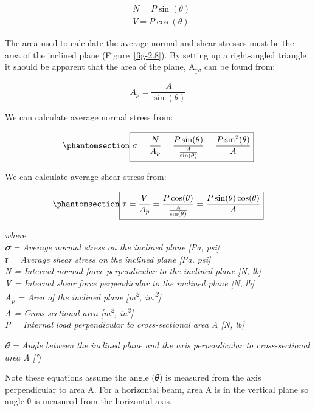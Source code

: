 \documentclass[
  letterpaper,
  DIV=11,
  numbers=noendperiod]{scrreprt}
\theoremstyle{definition}
\theoremstyle{remark}
\begin{document}
\[
\begin{aligned}
& N=P \sin (\theta) \\
& V=P \cos (\theta)
\end{aligned}
\]

The area used to calculate the average normal and shear stresses must be
the area of the inclined plane (Figure~\ref{fig-2.8}). By setting up a
right-angled triangle it should be apparent that the area of the plane,
A\textsubscript{p}, can be found from:

\[
A_p=\frac{A}{\sin (\theta)}
\]

We can calculate average normal stress from:

\begin{equation}\phantomsection\label{eq-2.3}{\boxed{\sigma=\frac{N}{A_p}=\frac{P \sin (\theta)}{\frac{A}{\sin (\theta)}}=\frac{P \sin ^2(\theta)}{A}}}\end{equation}

We can calculate average shear stress from:

\begin{equation}\phantomsection\label{eq-2.4}{\boxed{\tau=\frac{V}{A_p}=\frac{P \cos (\theta)}{\frac{A}{\sin (\theta)}}=\frac{P \sin (\theta) \cos (\theta)}{A}}}\end{equation}

\emph{where}\\
\emph{𝜎 = Average normal stress on the inclined plane {[}Pa, psi{]}}\\
\emph{τ = Average shear stress on the inclined plane {[}Pa, psi{]}}\\
\emph{N = Internal normal force perpendicular to the inclined plane
{[}N, lb{]}}\\
\emph{V = Internal shear force perpendicular to the inclined plane {[}N,
lb{]}}\\
\emph{A\textsubscript{p} = Area of the inclined plane
{[}m\textsuperscript{2}, in.\textsuperscript{2}{]}}\\
\emph{A = Cross-sectional area {[}m\textsuperscript{2},
in\textsuperscript{2}{]}}\\
\emph{P = Internal load perpendicular to cross-sectional area A {[}N,
lb{]}}

\emph{𝜃 = Angle between the inclined plane and the axis perpendicular to
cross-sectional area A {[}°{]}}

Note these equations assume the angle (𝜃) is measured from the axis
perpendicular to area A. For a horizontal beam, area A is in the
vertical plane so angle θ is measured from the horizontal axis.
\end{document}
